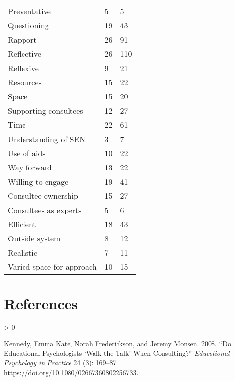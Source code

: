 \documentclass[
]{article}
\newlength{\cslhangindent}
\newenvironment{CSLReferences}[2] %
 {%
  \setlength{\parindent}{0pt}
  \ifodd #1 \everypar{\setlength{\hangindent}{\cslhangindent}}\ignorespaces\fi
  \ifnum #2 > 0
  \setlength{\parskip}{#2\baselineskip}
  \fi
 }%
 {}
\begin{document}
\begin{longtable}[]{@{}lll@{}}
Preventative & 5 & 5 \\
Questioning & 19 & 43 \\
Rapport & 26 & 91 \\
Reflective & 26 & 110 \\
Reflexive & 9 & 21 \\
Resources & 15 & 22 \\
Space & 15 & 20 \\
Supporting consultees & 12 & 27 \\
Time & 22 & 61 \\
Understanding of SEN & 3 & 7 \\
Use of aids & 10 & 22 \\
Way forward & 13 & 22 \\
Willing to engage & 19 & 41 \\
Consultee ownership & 15 & 27 \\
Consultees as experts & 5 & 6 \\
Efficient & 18 & 43 \\
Outside system & 8 & 12 \\
Realistic & 7 & 11 \\
Varied space for approach & 10 & 15 \\
\bottomrule
\end{longtable}

\hypertarget{references}{%
\section*{References}\label{references}}

\hypertarget{refs}{}
\begin{CSLReferences}{1}{0}
\leavevmode\hypertarget{ref-kennedyEducationalPsychologistsWalk2008}{}%
Kennedy, Emma Kate, Norah Frederickson, and Jeremy Monsen. 2008. {``Do
Educational Psychologists {`Walk the Talk'} When Consulting?''}
\emph{Educational Psychology in Practice} 24 (3): 169--87.
\url{https://doi.org/10.1080/02667360802256733}.

\end{CSLReferences}
\end{document}
